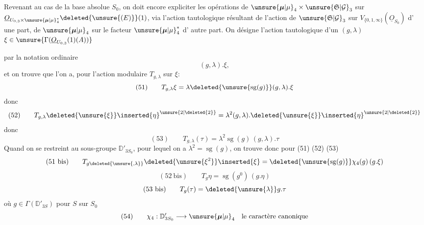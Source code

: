 Revenant au cas de la base absolue
$S_0$, on doit encore expliciter les
opérations de $\unsure{\boldsymbol{\mu}|\mu}_4\times\unsure{\mathfrak{S}|\mathcal G}_3$ sur
$\underline{O}_{U_{0,3}\times\unsure{\boldsymbol{\mu}|\mu}_4^*}\deleted{\unsure{(E)}}(1)$,
via l'action tautologique résultant de
l'action de $\unsure{\mathfrak{S}|\mathcal G}_3$ sur
$V_{\{0,1,\infty\}}(\underline{O}_{S_0})$ d'
une part, de  $\unsure{\boldsymbol{\mu}|\mu}_4$ sur le facteur $\unsure{\boldsymbol{\mu}|\mu}_4^*$ d'
autre part. On désigne l'action tautologique
d'un $(g,\lambda)$ 
$\xi\in\unsure{\Gamma(\underline{O}_{U_{0,3}}(1)(A))}$

par la notation ordinaire
\[
(g,\lambda).\xi,
\]
et on trouve que l'on a, pour l'action
modulaire $T_{g,\lambda}$ sur $\xi$:
\[
(51)\qquad T_{g,\lambda}\xi
=\lambda\deleted{\unsure{\operatorname{sg}(g)}}(g,\lambda).\xi
\]
donc
\[
(52)\qquad T_{g,\lambda}\deleted{\unsure{\xi}}\inserted{\eta}^{\unsure{2|\deleted{2}}}
=\lambda^2(g,\lambda).\deleted{\unsure{\xi}}\inserted{\eta}^{\unsure{2|\deleted{2}}}
\]
donc
\[
(53)\qquad T_{g,\lambda}(\tau)=\lambda^2\operatorname{sg}(g)\,(g,\lambda).\tau
\]
Quand on se restreint au sous-groupe
$\mathbb{D}'_{3S_0}$, pour lequel on a $\lambda^2=\operatorname{sg}(g)$, on
trouve donc pour (51) (52) (53)
\[
(51\ \mathrm{bis})\qquad
T_{g\deleted{\unsure{,\lambda}}}\deleted{\unsure{\xi^2}}\inserted{\xi}
=\deleted{\unsure{\operatorname{sg}(g)}}\chi_4(g)\,(g.\xi)
\]
\[
(52\ \mathrm{bis})\qquad T_g\eta=\operatorname{sg}(g^0)\,(g.\eta)
\]
\[
(53\ \mathrm{bis})\qquad T_g(\tau)=\deleted{\unsure{\lambda}}g.\tau
\]
où $g\in\Gamma(\mathbb{D}'_{3S})$ pour $S$ sur $S_0$
\[
(54)\qquad \chi_4:\mathbb{D}'_{3S_0}\longrightarrow\unsure{\boldsymbol{\mu}|\mu}_4
\quad\text{le caractère canonique}
\]

